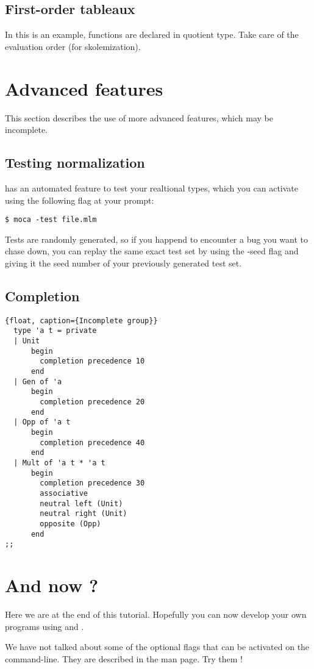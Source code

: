 \documentclass{article}
\begin{document}
\subsection{First-order tableaux}
\label{sec:fotab}

In this is an example, functions are declared in quotient type.
Take care of the evaluation order (for skolemization).


\section{Advanced features}
\label{sec:adv}

This section describes the use of more advanced \moca features, which
may be incomplete. 

\subsection{Testing normalization}
\label{sec:testing}

\moca has an automated feature to test your realtional types, which
you can activate using the following flag at your prompt:
\begin{verbatim}
$ moca -test file.mlm
\end{verbatim}

Tests are randomly generated, so if you happend to encounter a bug you
want to chase down, you can replay the same exact test set by using
the {\sf -seed} flag and giving it the seed number of your previously
generated test set.



\subsection{Completion}
\label{sec:comp}

\begin{lstlisting}{float, caption={Incomplete group}}
  type 'a t = private
  | Unit
      begin
        completion precedence 10
      end
  | Gen of 'a
      begin
        completion precedence 20
      end
  | Opp of 'a t
      begin
        completion precedence 40
      end
  | Mult of 'a t * 'a t
      begin
        completion precedence 30
        associative
        neutral left (Unit)
        neutral right (Unit)
        opposite (Opp)
      end
;;
\end{lstlisting}

\section{And now ?}
\label{sec:conc}

Here we are at the end of this tutorial. Hopefully you can now develop
your own programs using \moca and \ocaml.

We have not talked about some of the optional flags that can be
activated on the command-line. They are described in the man page. Try
them !



\end{document}
